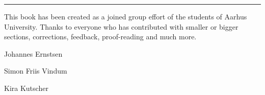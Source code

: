 \vspace{0.7em}
\noindent\hfil\rule{0.8\textwidth}{.4pt}\hfil

\vspace{2em}
\noindent This book has been created as a joined group effort of the students of
Aarhus University. Thanks to everyone who has contributed with smaller or bigger
sections, corrections, feedback, proof-reading and much more.

\begin{multicols}{2}
  Johannes Ernstsen

  Simon Friis Vindum
  
  \hfill
  \columnbreak
  
  Kira Kutscher
\end{multicols}

